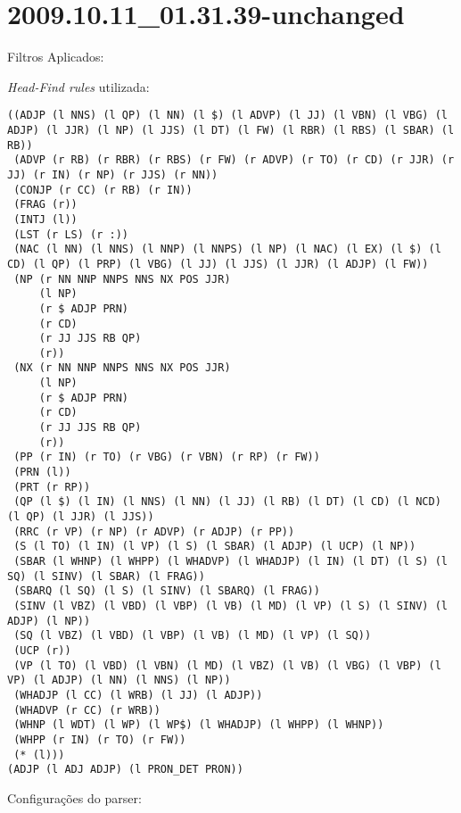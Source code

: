 \section{2009.10.11_01.31.39-unchanged} %
\label{sec:exp:2009.10.11_01.31.39-unchanged}

Filtros Aplicados:

\begin{itemize}
  
\end{itemize}

\emph{Head-Find rules} utilizada:

\scriptsize
\begin{verbatim}
((ADJP (l NNS) (l QP) (l NN) (l $) (l ADVP) (l JJ) (l VBN) (l VBG) (l ADJP) (l JJR) (l NP) (l JJS) (l DT) (l FW) (l RBR) (l RBS) (l SBAR) (l RB))
 (ADVP (r RB) (r RBR) (r RBS) (r FW) (r ADVP) (r TO) (r CD) (r JJR) (r JJ) (r IN) (r NP) (r JJS) (r NN))
 (CONJP (r CC) (r RB) (r IN))
 (FRAG (r))
 (INTJ (l))
 (LST (r LS) (r :))
 (NAC (l NN) (l NNS) (l NNP) (l NNPS) (l NP) (l NAC) (l EX) (l $) (l CD) (l QP) (l PRP) (l VBG) (l JJ) (l JJS) (l JJR) (l ADJP) (l FW))
 (NP (r NN NNP NNPS NNS NX POS JJR)
     (l NP)
     (r $ ADJP PRN)
     (r CD)
     (r JJ JJS RB QP)
     (r))
 (NX (r NN NNP NNPS NNS NX POS JJR)
     (l NP)
     (r $ ADJP PRN)
     (r CD)
     (r JJ JJS RB QP)
     (r))
 (PP (r IN) (r TO) (r VBG) (r VBN) (r RP) (r FW))
 (PRN (l))
 (PRT (r RP))
 (QP (l $) (l IN) (l NNS) (l NN) (l JJ) (l RB) (l DT) (l CD) (l NCD) (l QP) (l JJR) (l JJS))
 (RRC (r VP) (r NP) (r ADVP) (r ADJP) (r PP))
 (S (l TO) (l IN) (l VP) (l S) (l SBAR) (l ADJP) (l UCP) (l NP))
 (SBAR (l WHNP) (l WHPP) (l WHADVP) (l WHADJP) (l IN) (l DT) (l S) (l SQ) (l SINV) (l SBAR) (l FRAG))
 (SBARQ (l SQ) (l S) (l SINV) (l SBARQ) (l FRAG))
 (SINV (l VBZ) (l VBD) (l VBP) (l VB) (l MD) (l VP) (l S) (l SINV) (l ADJP) (l NP))
 (SQ (l VBZ) (l VBD) (l VBP) (l VB) (l MD) (l VP) (l SQ))
 (UCP (r))
 (VP (l TO) (l VBD) (l VBN) (l MD) (l VBZ) (l VB) (l VBG) (l VBP) (l VP) (l ADJP) (l NN) (l NNS) (l NP))
 (WHADJP (l CC) (l WRB) (l JJ) (l ADJP))
 (WHADVP (r CC) (r WRB))
 (WHNP (l WDT) (l WP) (l WP$) (l WHADJP) (l WHPP) (l WHNP))
 (WHPP (r IN) (r TO) (r FW))
 (* (l)))
(ADJP (l ADJ ADJP) (l PRON_DET PRON))

\end{verbatim}

\normalsize

Configurações do parser:

